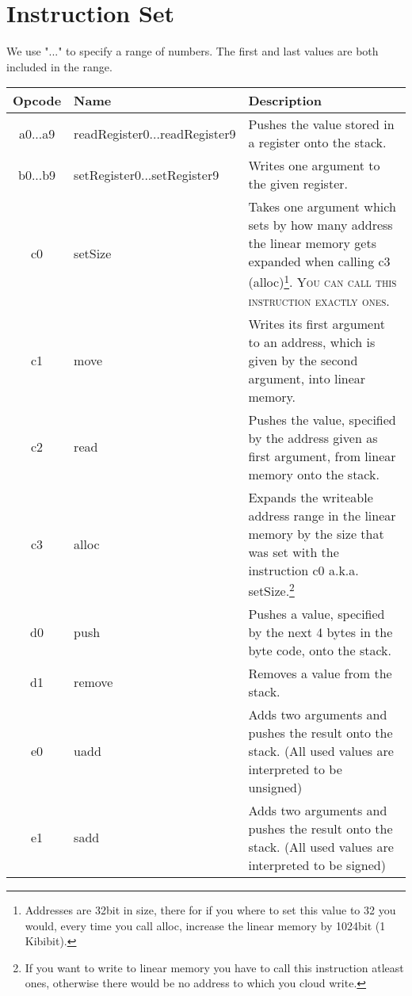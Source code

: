 \documentclass[10pt,a4paper]{article}
\begin{document}
	\newpage
	\section{Instruction Set}
	\label{instruction_set}
	{\small We use "..." to specify a range of numbers. The first and last values are both included in the range.} \\
	\begin{longtable}[c]{c|l|p{9cm}}
		\hline
		Opcode & Name & Description \\
		\hline
		\hex a0...\hex a9 & readRegister0...readRegister9 & Pushes the value stored in a register onto the stack. \\
		\hline
		\hex b0...\hex b9 & setRegister0...setRegister9 & Writes one argument to the given register. \\
		\hline
		\hline
		\hex c0 & setSize & Takes one argument which sets by how many address the linear memory gets expanded when calling \hex c3 (alloc)\footnote{Addresses are 32bit in size, there for if you where to set this value to 32 you would, every time you call alloc, increase the linear memory by 1024bit (1 Kibibit).}. \textsc{You can call this instruction exactly ones.} \\
		\hline
		\hex c1 & move & Writes its first argument to an address, which is given by the second argument, into linear memory. \\
		\hline		
		\hex c2 & read & Pushes the value, specified by the address given as first argument, from linear memory onto the stack. \\
		\hline
		\hex c3 & alloc & Expands the writeable address range in the linear memory by the size that was set with the instruction \hex c0 a.k.a. setSize.\footnote{If you want to write to linear memory you have to call this instruction atleast ones, otherwise
there would be no address to which you cloud write.}\\
		\hline	
		\hline	
		\hex d0 & push & Pushes a value, specified by the next 4 bytes in the byte code, onto the stack. \\
		\hline		
		\hex d1 & remove & Removes a value from the stack. \\
		\hline	
		\hline	
		\hex e0 & uadd & Adds two arguments and pushes the result onto the stack. (All used values are interpreted to be unsigned) \\
		\hline		
		\hex e1 & sadd & Adds two arguments and pushes the result onto the stack. (All used values are interpreted to be signed) \\

\end{longtable}
\end{document}
